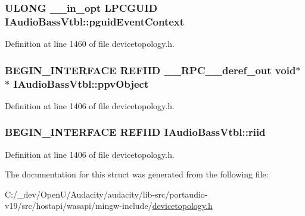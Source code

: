 \subsubsection[{\texorpdfstring{pguid\+Event\+Context}{pguidEventContext}}]{ {\bf U\+L\+O\+NG} {\bf \+\_\+\+\_\+in\+\_\+opt} {\bf L\+P\+C\+G\+U\+ID} I\+Audio\+Bass\+Vtbl\+::pguid\+Event\+Context}\hypertarget{struct_i_audio_bass_vtbl_a8fba6e36b29050fa30a8da53b3efb341}{}\label{struct_i_audio_bass_vtbl_a8fba6e36b29050fa30a8da53b3efb341}


Definition at line 1460 of file devicetopology.\+h.

\subsubsection[{\texorpdfstring{ppv\+Object}{ppvObject}}]{\setlength{\rightskip}{0pt plus 5cm}B\+E\+G\+I\+N\+\_\+\+I\+N\+T\+E\+R\+F\+A\+CE {\bf R\+E\+F\+I\+ID} {\bf \+\_\+\+\_\+\+R\+P\+C\+\_\+\+\_\+deref\+\_\+out} {\bf void}$\ast$$\ast$ I\+Audio\+Bass\+Vtbl\+::ppv\+Object}\hypertarget{struct_i_audio_bass_vtbl_a9b07696d422786ee9ba37bff63506e82}{}\label{struct_i_audio_bass_vtbl_a9b07696d422786ee9ba37bff63506e82}


Definition at line 1406 of file devicetopology.\+h.

\subsubsection[{\texorpdfstring{riid}{riid}}]{\setlength{\rightskip}{0pt plus 5cm}B\+E\+G\+I\+N\+\_\+\+I\+N\+T\+E\+R\+F\+A\+CE {\bf R\+E\+F\+I\+ID} I\+Audio\+Bass\+Vtbl\+::riid}\hypertarget{struct_i_audio_bass_vtbl_a044e6cbb5974041701db0079ca74c6b1}{}\label{struct_i_audio_bass_vtbl_a044e6cbb5974041701db0079ca74c6b1}


Definition at line 1406 of file devicetopology.\+h.



The documentation for this struct was generated from the following file\+:\begin{DoxyCompactItemize}
\item 
C\+:/\+\_\+dev/\+Open\+U/\+Audacity/audacity/lib-\/src/portaudio-\/v19/src/hostapi/wasapi/mingw-\/include/\hyperlink{devicetopology_8h}{devicetopology.\+h}\end{DoxyCompactItemize}
